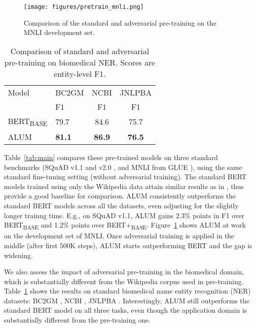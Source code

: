 \documentclass[11pt,a4paper]{article}
\newcommand\DNAME{ALUM}
\newcommand{\alumbert}{ALUM}
\begin{document}
\begin{figure}[ht]
	\centering
    {
	\texttt{[image: figures/pretrain\_mnli.png]}
    }
	\caption{Comparison of the standard and adversarial pre-training on the MNLI development set.}
	\label{fig:alum}
\end{figure}
\begin{table}[ht]
    \centering
    \begin{tabular}{@{\hskip2pt}l@{\hskip3pt}|@{\hskip3pt}l@{\hskip3pt}|@{\hskip3pt}c@{\hskip3pt}|@{\hskip3pt}c@{\hskip2pt}}
    \toprule
    Model & BC2GM & NCBI & JNLPBA \\
          & F1 & F1 & F1 \\ 
          \hline
    BERT\textsubscript{BASE} &79.7 &84.6& 75.7 \\ \hline      
    \alumbert{} &\textbf{81.1} & \textbf{86.9} &  \textbf{76.5} \\
        \bottomrule

    \end{tabular}
    \caption{Comparison of standard and adversarial pre-training on biomedical NER. Scores are entity-level F1.}
    \label{tab:biomed_eval}
\end{table}


Table~\ref{tab:main} compares these pre-trained models on three standard benchmarks (SQuAD v1.1 \cite{squad1} and v2.0 \cite{squad2}, and MNLI from GLUE \cite{wang2018glue}), using the same standard fine-tuning setting (without adversarial training).
The standard BERT models trained using only the Wikipedia data attain similar results as in \citet{devlin2018bert}, thus provide a good baseline for comparison.
\alumbert{} consistently outperforms the standard BERT models across all the datasets, even adjusting for the slightly longer trainng time. E.g., on SQuAD v1.1, \alumbert{} gains 2.3\% points in F1 over {BERT\textsubscript{BASE}} and 1.2\% points over {BERT+\textsubscript{BASE}}.
Figure~\ref{fig:alum} shows {\DNAME} at work on the development set of MNLI. Once adversarial training is applied in the middle (after first 500K steps), {\DNAME} starts outperforming BERT and the gap is widening.

We also assess the impact of adversarial pre-training in the biomedical domain, which is substantially different from the Wikipedia corpus used in pre-training.
Table~\ref{tab:biomed_eval} shows the results on standard biomedical name entity recognition (NER) datasets: BC2GM \cite{smith2008bc2gm}, NCBI \cite{dogan2014ncbi}, JNLPBA \cite{collier-kim-2004-JNLPBA}. Interestingly, {\DNAME} still outperforms the standard BERT model on all three tasks, even though the application domain is substantially different from the pre-training one.
\end{document}
